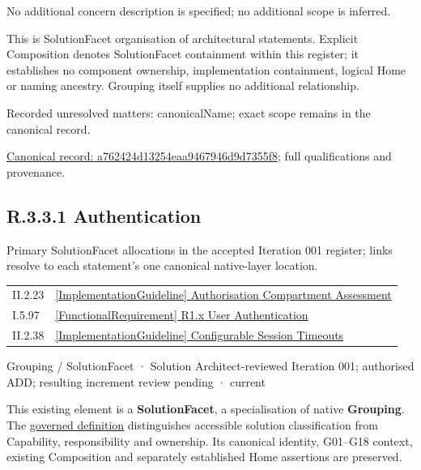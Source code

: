 No additional concern description is specified; no additional scope is inferred.



This is SolutionFacet organisation of architectural statements. Explicit Composition denotes SolutionFacet containment within this register; it establishes no component ownership, implementation containment, logical Home or naming ancestry. Grouping itself supplies no additional relationship.


{\small Recorded unresolved matters: canonicalName; exact scope remains in the canonical record.}\par
{\footnotesize \href{../../../../../../../continuum/grouping/a762424d13254eaa9467946d9d7355f8.md}{Canonical record: a762424d13254eaa9467946d9d7355f8}; full qualifications and provenance.}\par
\subsection*{R.3.3.1 Authentication}
\label{navigation:R.3.3.1}

Primary SolutionFacet allocations in the accepted Iteration 001 register; links resolve to each statement’s one canonical native-layer location.\par
\begin{longtable}{p{.22\linewidth}p{.73\linewidth}}
II.2.23 & \hyperref[element:a471a150c7d24210a991e96ed82e27a2]{[ImplementationGuideline] Authorisation Compartment Assessment} \\
I.5.97 & \hyperref[element:9683182663cd40428d806ed2d8685511]{[FunctionalRequirement] R1.x User Authentication} \\
II.2.38 & \hyperref[element:886896239b2e40b0b3bda53e922a2ab6]{[ImplementationGuideline] Configurable Session Timeouts} \\
\end{longtable}
\label{element:f29ffa95c89d470b8a32e1369696327f}
{\small Grouping / SolutionFacet · Solution Architect-reviewed Iteration 001; authorised ADD; resulting increment review pending · current}\par

This existing element is a \textbf{SolutionFacet}, a specialisation of native
\textbf{Grouping}. The \href{\detokenize{../../../../../../../governance/continuum-representation.md#solutionfacet-classification--1119-candidate}}{governed definition}
distinguishes accessible solution classification from Capability, responsibility
and ownership. Its canonical identity, G01–G18 context, existing Composition
and separately established Home assertions are preserved.



